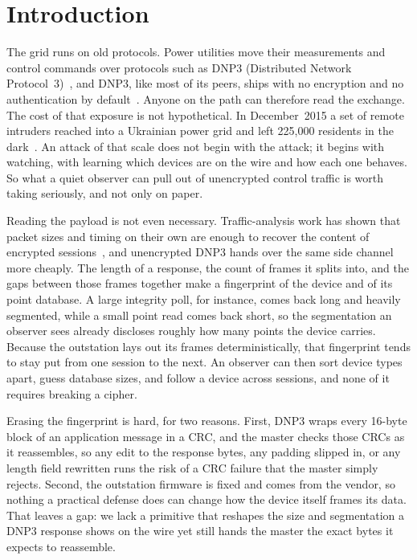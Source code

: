\documentclass[conference]{IEEEtran}
\begin{document}
\section{Introduction}

The grid runs on old protocols. Power utilities move their measurements and
control commands over protocols such as DNP3 (Distributed Network
Protocol~3)~\cite{ref:dnp3}, and DNP3, like most of its peers, ships with no
encryption and no authentication by default~\cite{ref:dnp3}. Anyone on the path
can therefore read the exchange. The cost of that exposure is not hypothetical.
In December~2015 a set of remote intruders reached into a Ukrainian power grid
and left 225{,}000 residents in the dark~\cite{ref:ukraine}. An attack of that
scale does not begin with the attack; it begins with watching, with learning
which devices are on the wire and how each one behaves. So what a quiet observer
can pull out of unencrypted control traffic is worth taking seriously, and not
only on paper.

Reading the payload is not even necessary. Traffic-analysis work has shown that
packet sizes and timing on their own are enough to recover the content of
encrypted sessions~\cite{ref:fp}, and unencrypted DNP3 hands over the same side
channel more cheaply. The length of a response, the count of frames it splits
into, and the gaps between those frames together make a fingerprint of the device
and of its point database. A large integrity poll, for instance, comes back long
and heavily segmented, while a small point read comes back short, so the
segmentation an observer sees already discloses roughly how many points the
device carries. Because the outstation lays out its frames deterministically,
that fingerprint tends to stay put from one session to the next. An observer can
then sort device types apart, guess database sizes, and follow a device across
sessions, and none of it requires breaking a cipher.

Erasing the fingerprint is hard, for two reasons. First, DNP3 wraps every 16-byte
block of an application message in a CRC, and the master checks those CRCs as it
reassembles, so any edit to the response bytes, any padding slipped in, or any
length field rewritten runs the risk of a CRC failure that the master simply
rejects. Second, the outstation firmware is fixed and comes from the vendor, so
nothing a practical defense does can change how the device itself frames its
data. That leaves a gap: we lack a primitive that reshapes the size and
segmentation a DNP3 response shows on the wire yet still hands the master the
exact bytes it expects to reassemble.
\end{document}
